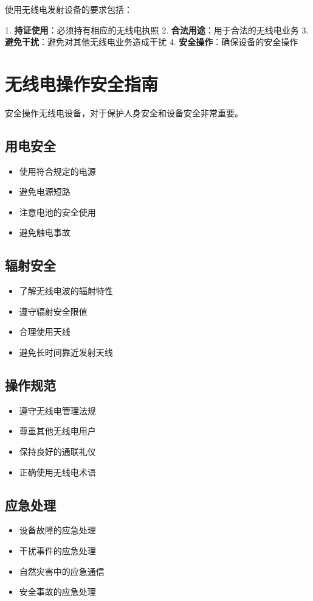 \documentclass[12pt,UTF8]{ctexbook}
\begin{document}
使用无线电发射设备的要求包括：

1. \textbf{持证使用}：必须持有相应的无线电执照
2. \textbf{合法用途}：用于合法的无线电业务
3. \textbf{避免干扰}：避免对其他无线电业务造成干扰
4. \textbf{安全操作}：确保设备的安全操作

\chapter{无线电操作安全指南}

安全操作无线电设备，对于保护人身安全和设备安全非常重要。

\section{用电安全}\begin{itemize}
  \item 使用符合规定的电源
  \item 避免电源短路
  \item 注意电池的安全使用
  \item 避免触电事故\end{itemize}

\section{辐射安全}\begin{itemize}
  \item 了解无线电波的辐射特性
  \item 遵守辐射安全限值
  \item 合理使用天线
  \item 避免长时间靠近发射天线\end{itemize}

\section{操作规范}\begin{itemize}
  \item 遵守无线电管理法规
  \item 尊重其他无线电用户
  \item 保持良好的通联礼仪
  \item 正确使用无线电术语\end{itemize}

\section{应急处理}\begin{itemize}
  \item 设备故障的应急处理
  \item 干扰事件的应急处理
  \item 自然灾害中的应急通信
  \item 安全事故的应急处理\end{itemize}
\end{document}
